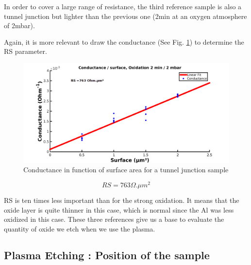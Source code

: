                 In order to cover a large range of resistance, the third reference sample is also a tunnel junction but lighter than the previous one (2min at an oxygen atmosphere of 2mbar).
                
                Again, it is more relevant to draw the conductance (See Fig. \ref{Regularox}) to determine the RS parameter.
                
                \begin{figure}
                    \centering
                    \includegraphics[width=15cm]{ConductanceFitOx.png}
                    \caption{Conductance in function of surface area for a tunnel junction sample}
                    \label{Regularox}
                \end{figure}
                                
                \[RS=763\Omega.\mu m^2\]
                
                RS is ten times less important than for the strong oxidation. It means that the oxide layer is quite thinner in this case, which is normal since the Al was less oxidized in this case.
                These three references give us a base to evaluate the quantity of oxide we etch when we use the plasma.
                \subsection{Plasma Etching : Position of the sample}
                
